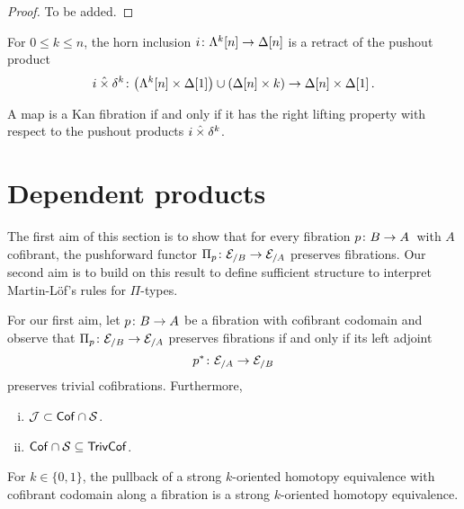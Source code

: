 \documentclass[reqno,10pt,a4paper,oneside,draft]{amsart}
\begin{document}
\begin{proof} To be added.
\end{proof} 



\begin{lemma} For $0 \leq k \leq n$, the horn inclusion $i \colon \Lambda^k[n] \to \Delta[n]$ is a retract of
the pushout product
\[
i \mathbin{\hat{\times}} \delta^k \colon \big( \Lambda^k[n] \times \Delta[1] \big) \cup (\Delta[n] \times {k}) \to \Delta[n] \times \Delta[1] \, .
\]
\end{lemma} 

\begin{proposition} A map is a Kan fibration if and only if it has the right lifting property with respect to the pushout products $i \mathbin{\hat{\times}} \delta^k$.
\end{proposition} 


\newpage

\section{Dependent products}

The first aim of this section is to show that for every fibration $p \colon B \to A$~with $A$ cofibrant, the pushforward functor $\Pi_p \colon \mathcal{E}_{/B} \to \mathcal{E}_{/A}$ 
preserves fibrations. Our second aim is to build on this result to define sufficient structure to interpret Martin-L\"of's rules for $\Pi$-types. 

\medskip

For our first aim, let $p \colon B \to A$ be a fibration with cofibrant codomain and observe that 
$\Pi_p \colon \mathcal{E}_{/B} \to \mathcal{E}_{/A}$  preserves fibrations if and only if its left adjoint 
\[
p^* \colon \mathcal{E}_{/A} \to \mathcal{E}_{/B}
\]
preserves trivial cofibrations. Furthermore,
\begin{lemma} \label{thm:missing-1}
\hfill 
\begin{enumerate}[(i)] 
\item $\mathcal{J} \subset \mathsf{Cof} \cap \mathcal{S}$.
\item $\mathsf{Cof} \cap \mathcal{S} \subseteq \mathsf{TrivCof}$.
\end{enumerate}
\end{lemma} 

\begin{lemma} 
\label{thm:missing-2}
For $k \in \{0,1\}$, the pullback of a strong $k$-oriented homotopy equivalence 
with cofibrant codomain along a
fibration is a strong $k$-oriented homotopy equivalence.
\end{lemma}
\end{document}
